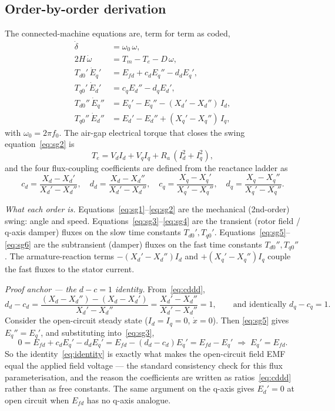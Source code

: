 \documentclass[12pt,a4paper]{article}
\theoremstyle{remark}
\begin{document}
\subsection{Order-by-order derivation}
The connected-machine equations are, term for term as coded,
\begin{align}
  \dot\delta            &= \omega_0\,\omega, \label{eq:sg1}\\
  2H\,\dot\omega        &= T_m - T_e - D\,\omega, \label{eq:sg2}\\
  T_{d0}'\,\dot{E}_q'   &= E_{fd} + c_d E_q'' - d_d E_q', \label{eq:sg3}\\
  T_{q0}'\,\dot{E}_d'   &= c_q E_d'' - d_q E_d', \label{eq:sg4}\\
  T_{d0}''\,\dot{E}_q''  &= E_q' - E_q'' - (X_d'-X_d'')\,I_d, \label{eq:sg5}\\
  T_{q0}''\,\dot{E}_d''  &= E_d' - E_d'' + (X_q'-X_q'')\,I_q, \label{eq:sg6}
\end{align}
with $\omega_0=2\pi f_0$. The air-gap electrical torque that closes the swing
equation~\eqref{eq:sg2} is
\begin{equation}
  T_e = V_d I_d + V_q I_q + R_a\,(I_d^2+I_q^2), \label{eq:sgte}
\end{equation}
and the four flux-coupling coefficients are defined from the reactance ladder as
\begin{equation}
  c_d=\frac{X_d-X_d'}{X_d'-X_d''},\quad
  d_d=\frac{X_d-X_d''}{X_d'-X_d''},\quad
  c_q=\frac{X_q-X_q'}{X_q'-X_q''},\quad
  d_q=\frac{X_q-X_q''}{X_q'-X_q''}.
  \label{eq:cddd}
\end{equation}

\emph{What each order is.}
Equations~\eqref{eq:sg1}--\eqref{eq:sg2} are the mechanical (2nd-order) swing:
angle and speed. Equations~\eqref{eq:sg3}--\eqref{eq:sg4} are the transient (rotor
field / q-axis damper) fluxes on the slow time constants $T_{d0}',T_{q0}'$.
Equations~\eqref{eq:sg5}--\eqref{eq:sg6} are the subtransient (damper) fluxes on
the fast time constants $T_{d0}'',T_{q0}''$. The armature-reaction terms
$-(X_d'-X_d'')I_d$ and $+(X_q'-X_q'')I_q$ couple the fast fluxes to the stator
current.

\emph{Proof anchor --- the $d-c=1$ identity.}
From~\eqref{eq:cddd},
\begin{equation}
  d_d-c_d=\frac{(X_d-X_d'')-(X_d-X_d')}{X_d'-X_d''}
         =\frac{X_d'-X_d''}{X_d'-X_d''}=1,
  \qquad\text{and identically } d_q-c_q=1.
  \label{eq:identity}
\end{equation}
Consider the open-circuit steady state ($I_d=I_q=0$, $\dot x=0$). Then
\eqref{eq:sg5} gives $E_q''=E_q'$, and substituting into~\eqref{eq:sg3},
\begin{equation}
  0=E_{fd}+c_d E_q'-d_d E_q'=E_{fd}-(d_d-c_d)E_q'=E_{fd}-E_q'
  \;\Longrightarrow\; E_q'=E_{fd}.
\end{equation}
So the identity~\eqref{eq:identity} is exactly what makes the open-circuit field
EMF equal the applied field voltage --- the standard consistency check for this
flux parameterisation, and the reason the coefficients are written as
ratios~\eqref{eq:cddd} rather than as free constants. The same argument on the
q-axis gives $E_d'=0$ at open circuit when $E_{fd}$ has no q-axis analogue.
\end{document}
